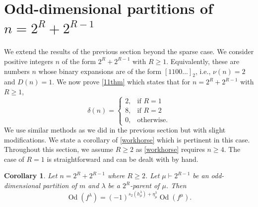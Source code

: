 \documentclass[12pt]{amsart}
\newtheorem{corollary}[theorem]{Corollary}
\theoremstyle{definition}
\numberwithin{equation}{section}
\DeclareMathOperator{\Od}{Od}
\begin{document}
\section{Odd-dimensional partitions of \texorpdfstring{$n = 2^R + 2^{R-1}$}{n = 2R + 2R-1}}\label{sec:proof11}
We extend the results of the previous section beyond the sparse case. We consider positive integers $n$ of the form $2^R + 2^{R-1}$ with $R\geq 1$. Equivalently, these are numbers $n$ whose binary expansions are of the form $[{1100...}]_2$, i.e., $\nu(n) = 2$ and $D(n) = 1$. We now prove \cref{11thm} which states that for $n = 2^R + 2^{R-1}$ with $R\geq 1$,
\[
\delta(n) = \begin{cases}
2, & \text{if } R = 1\\
8, & \text{if } R = 2\\
0, & \text{otherwise}.
\end{cases}
\]
We use similar methods as we did in the previous section but with slight modifications. We state a corollary of \cref{workhorse} which is pertinent in this case. Throughout this section, we assume  $R\geq 2$ as \cref{workhorse} requires $n\geq 4$. The case of $R = 1$ is straightforward and can be dealt with by hand.
\begin{corollary}
Let $n = 2^R + 2^{R-1}$ where $R \geq 2$. Let $\mu\vdash 2^{R-1}$ be an odd-dimensional partition of $m$ and $\lambda$ be a $2^R$-parent of $\mu$. Then
\[
\Od(f^{\lambda}) = (-1)^{s_2(h^\lambda_\mu) + \eta^\lambda_{\mu}}\Od(f^\mu).
\]
\end{corollary}
\end{document}
